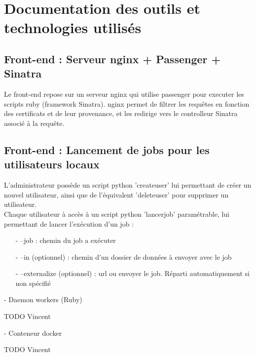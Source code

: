 \newpage

\chapter{Documentation des outils et technologies utilisés}

\section{Front-end : Serveur nginx + Passenger + Sinatra}

Le front-end repose sur un serveur nginx qui utilise passenger pour executer les scripts ruby (framework Sinatra).
nginx permet de filtrer les requêtes en fonction des certificats et de leur provenance, et les redirige vers le controlleur Sinatra associé à la requête.

\section{Front-end : Lancement de jobs pour les utilisateurs locaux} 

L'administrateur possède un script python 'createuser' lui permettant de créer un nouvel utilisateur, ainsi que de l'équivalent 'deleteuser' pour supprimer un utilisateur. \\

Chaque utilisateur à accès à un script python 'lancerjob' paramétrable, lui permettant de lancer l'exécution d'un job :\\
\begin{itemize}
\item[-] --job : chemin du job a exécuter
\item[-] --in (optionnel) : chemin d'un dossier de données à envoyer avec le job
\item[-] --externalize (optionnel) : url ou envoyer le job. Réparti automatiquement si non spécifié
\end{itemize}

- Daemon workers (Ruby) 

TODO Vincent

- Conteneur docker

TODO Vincent

